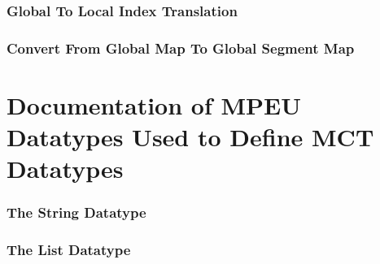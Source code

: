 \documentclass{article}
\begin{document}
\section{Global To Local Index Translation}

\vspace*{\fill}
\newpage
%
\section{Convert From Global Map To Global Segment Map}

\vspace*{\fill}
\newpage

\part{Documentation of MPEU Datatypes Used to Define MCT Datatypes}
%
\section{The String Datatype} 

\vspace*{\fill}
\newpage
%
\section{The List Datatype}

\vspace*{\fill}
\newpage


 
%
\end{document}
